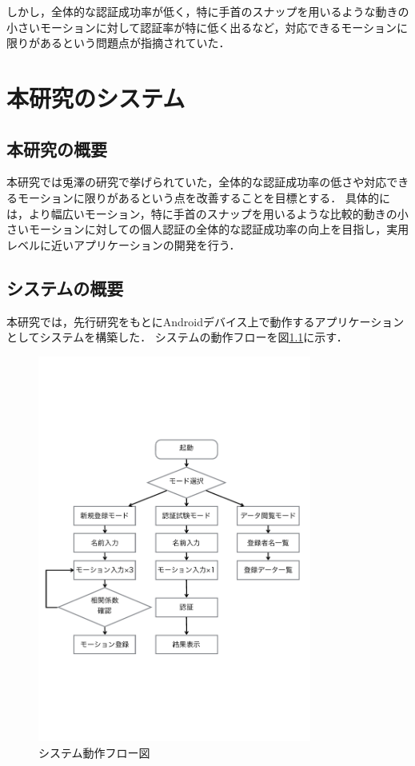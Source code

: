 \documentclass[11pt]{jreport}
\begin{document}
    しかし，全体的な認証成功率が低く，特に手首のスナップを用いるような動きの小さいモーションに対して認証率が特に低く出るなど，対応できるモーションに限りがあるという問題点が指摘されていた．

\chapter{本研究のシステム}
    \section{本研究の概要}
    本研究では兎澤の研究で挙げられていた，全体的な認証成功率の低さや対応できるモーションに限りがあるという点を改善することを目標とする．
    具体的には，より幅広いモーション，特に手首のスナップを用いるような比較的動きの小さいモーションに対しての個人認証の全体的な認証成功率の向上を目指し，実用レベルに近いアプリケーションの開発を行う．

    \section{システムの概要}
    本研究では，先行研究をもとにAndroidデバイス上で動作するアプリケーションとしてシステムを構築した．
    システムの動作フローを図\ref{flow}に示す．

    \begin{figure}[btp]
        \begin{center}
            \includegraphics[width=9cm, bb=0 183 594 670]{Flow.pdf}
            \caption{システム動作フロー図}
            \label{flow}
        \end{center}
    \end{figure}
\end{document}
